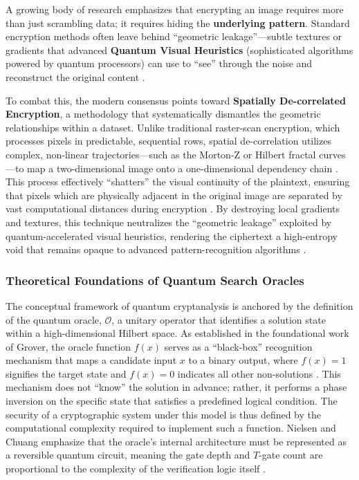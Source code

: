 \documentclass[12pt,fleqn]{article}
\begin{document}
A growing body of research emphasizes that encrypting an image requires more than just scrambling data; it requires hiding the \textbf{underlying pattern}. Standard encryption methods often leave behind ``geometric leakage''---subtle textures or gradients that advanced \textbf{Quantum Visual Heuristics} (sophisticated algorithms powered by quantum processors) can use to ``see'' through the noise and reconstruct the original content \cite{shannon1949communication, zhou2015image}. 

To combat this, the modern consensus points toward \textbf{Spatially De-correlated Encryption}, a methodology that systematically dismantles the geometric relationships within a dataset. Unlike traditional raster-scan encryption, which processes pixels in predictable, sequential rows, spatial de-correlation utilizes complex, non-linear trajectories---such as the Morton-Z or Hilbert fractal curves---to map a two-dimensional image onto a one-dimensional dependency chain \cite{moon2001analysis}. This process effectively ``shatters'' the visual continuity of the plaintext, ensuring that pixels which are physically adjacent in the original image are separated by vast computational distances during encryption \cite{li2008security}. By destroying local gradients and textures, this technique neutralizes the ``geometric leakage'' exploited by quantum-accelerated visual heuristics, rendering the ciphertext a high-entropy void that remains opaque to advanced pattern-recognition algorithms \cite{yaroslavsky2011linking}.

\subsubsection{Theoretical Foundations of Quantum Search Oracles}

The conceptual framework of quantum cryptanalysis is anchored by the definition of the quantum oracle, $\mathcal{O}$, a unitary operator that identifies a solution state within a high-dimensional Hilbert space. As established in the foundational work of Grover, the oracle function $f(x)$ serves as a ``black-box'' recognition mechanism that maps a candidate input $x$ to a binary output, where $f(x) = 1$ signifies the target state and $f(x) = 0$ indicates all other non-solutions \cite{grover1996fast}. This mechanism does not ``know'' the solution in advance; rather, it performs a phase inversion on the specific state that satisfies a predefined logical condition. The security of a cryptographic system under this model is thus defined by the computational complexity required to implement such a function. Nielsen and Chuang emphasize that the oracle's internal architecture must be represented as a reversible quantum circuit, meaning the gate depth and $T$-gate count are proportional to the complexity of the verification logic itself \cite{nielsen2010quantum}.
\end{document}
